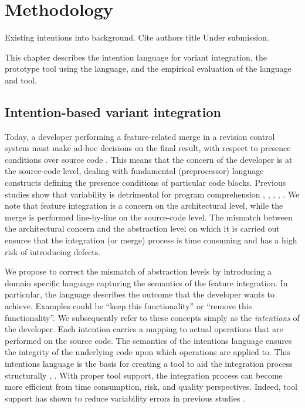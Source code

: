 \chapter{Methodology}
Existing intentions into background. Cite authors title Under submission.

This chapter describes the intention language for variant integration, the prototype tool using the language, and the empirical evaluation of the language and tool.

\section{Intention-based variant integration}
Today, a developer performing a feature-related merge in a revision control system must make ad-hoc decisions on the final result, with respect to presence conditions over source code \cite{stanciulescu2016concepts}. This means that the concern of the developer is at the source-code level, dealing with fundamental (preprocessor) language constructs defining the presence conditions of particular code blocks. Previous studies show that variability is detrimental for program comprehension \cite{melo2016latin}, \cite{favre1997understanding}, \cite{ernst2002preprocessor}, \cite{abal2014variability}, \cite{medeiros2015preprocessor} . We note that feature integration is a concern on the architectural level, while the merge is performed line-by-line on the source-code level. The mismatch between the architectural concern and the abstraction level on which it is carried out ensures that the integration (or merge) process is time consuming and has a high risk of introducing defects.

We propose to correct the mismatch of abstraction levels by introducing a domain specific language capturing the semantics of the feature integration. In particular, the language describes the outcome that the developer wants to achieve. Examples could be ``keep this functionality'' or ``remove this functionality''. We subsequently refer to these concepts simply as the \textit{intentions} of the developer. Each intention carries a mapping to actual operations that are performed on the source code. The semantics of the intentions language ensures the integrity of the underlying code upon which operations are applied to. This intentions language is the basis for creating a tool to aid the integration process structurally \cite{mens2002}, \cite{apel2011}. With proper tool support, the integration process can become more efficient from time consumption, risk, and quality perspectives. Indeed, tool support has shown to reduce variability errors in previous studies \cite{ribeiro2014emergent}.

